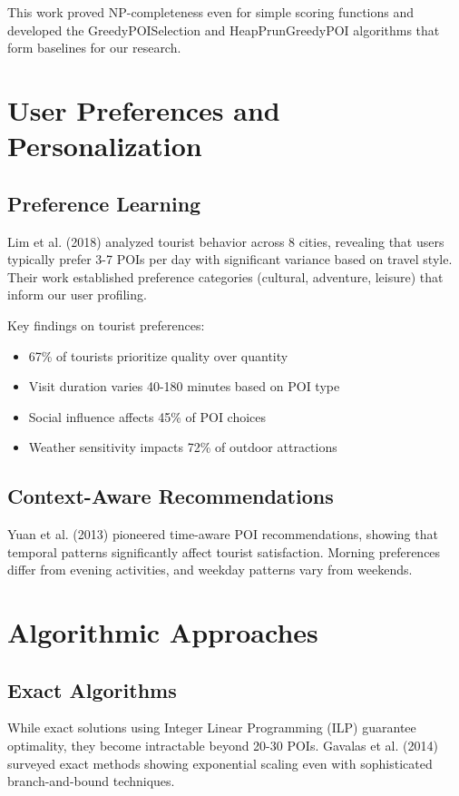 This work proved NP-completeness even for simple scoring functions and developed the GreedyPOISelection and HeapPrunGreedyPOI algorithms that form baselines for our research.

\section{User Preferences and Personalization}

\subsection{Preference Learning}

Lim et al. (2018) analyzed tourist behavior across 8 cities, revealing that users typically prefer 3-7 POIs per day with significant variance based on travel style. Their work established preference categories (cultural, adventure, leisure) that inform our user profiling.

Key findings on tourist preferences:
\begin{itemize}
    \item 67\% of tourists prioritize quality over quantity
    \item Visit duration varies 40-180 minutes based on POI type
    \item Social influence affects 45\% of POI choices
    \item Weather sensitivity impacts 72\% of outdoor attractions
\end{itemize}

\subsection{Context-Aware Recommendations}

Yuan et al. (2013) pioneered time-aware POI recommendations, showing that temporal patterns significantly affect tourist satisfaction. Morning preferences differ from evening activities, and weekday patterns vary from weekends.

\section{Algorithmic Approaches}

\subsection{Exact Algorithms}

While exact solutions using Integer Linear Programming (ILP) guarantee optimality, they become intractable beyond 20-30 POIs. Gavalas et al. (2014) surveyed exact methods showing exponential scaling even with sophisticated branch-and-bound techniques.

